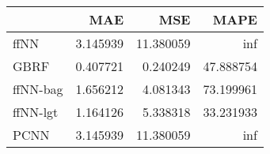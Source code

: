 \begin{tabular}{lrrr}
\toprule
{} &       MAE &        MSE &       MAPE \\
\midrule
ffNN     &  3.145939 &  11.380059 &        inf \\
GBRF     &  0.407721 &   0.240249 &  47.888754 \\
ffNN-bag &  1.656212 &   4.081343 &  73.199961 \\
ffNN-lgt &  1.164126 &   5.338318 &  33.231933 \\
PCNN     &  3.145939 &  11.380059 &        inf \\
\bottomrule
\end{tabular}
